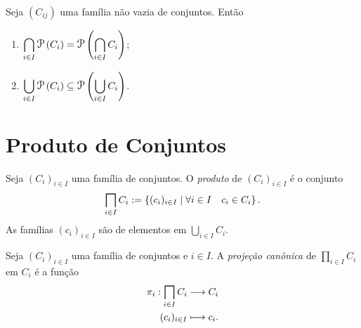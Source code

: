 \begin{prop}
Seja $(C_{ij})$ uma família não vazia de conjuntos. Então
	\begin{enumerate}
	\item $\displaystyle\bigcap_{i \in I} \p\left(C_i \right) = \p\left(\displaystyle\bigcap_{i \in I} C_i \right)$;
	\item $\displaystyle\bigcup_{i \in I} \p\left(C_i \right) \subseteq \p\left(\displaystyle\bigcup_{i \in I} C_i \right)$.
	\end{enumerate}
\end{prop}

\cleardoublepage
\section{Produto de Conjuntos}

   \begin{defi}
Seja $(C_i)_{i \in I}$ uma família de conjuntos. O \emph{produto} de $(C_i)_{i \in I}$ é o conjunto
	\begin{equation*}
	\prod_{i \in I} C_i := \set{(c_i)_{i \in I}}{\forall i \in I \quad c_i \in C_i}.
	\end{equation*}
As famílias $(c_i)_{i \in I}$ são de elementos em $\bigcup_{i \in I} C_i$.
\end{defi}

\begin{defi}
Seja $(C_i)_{i \in I}$ uma família de conjuntos e $i \in I$. A \emph{projeção canônica} de $\prod_{i \in I} C_i$ em $C_i$ é a função
	\begin{align*}
	\func{\pi_i}{\prod_{i \in I} C_i}{C_i}{(c_i)_{i \in I}}{c_i}.
	\end{align*}
\end{defi}

